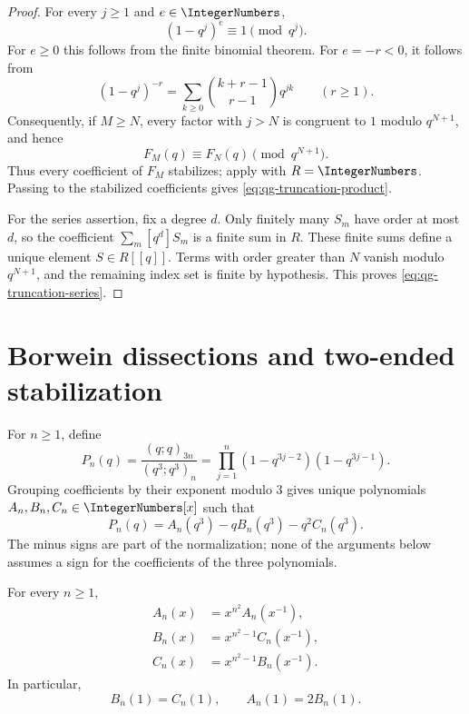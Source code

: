 \begin{proof}
For every \(j\ge1\) and \(e\in\IntegerNumbers\),
\[
 (1-q^j)^e\equiv1\pmod{q^j}.
\]
For \(e\ge0\) this follows from the finite binomial theorem.  For
\(e=-r<0\), it follows from
\[
 (1-q^j)^{-r}
 =\sum_{k\ge0}\binom{k+r-1}{r-1}q^{jk}
 \qquad(r\ge1).
\]
Consequently, if \(M\ge N\), every factor with \(j>N\) is congruent to \(1\)
modulo \(q^{N+1}\), and hence
\[
 F_M(q)\equiv F_N(q)\pmod{q^{N+1}}.
\]
Thus every coefficient of \(F_M\) stabilizes; apply
 with \(R=\IntegerNumbers\).  Passing to
the stabilized coefficients gives \eqref{eq:qg-truncation-product}.

For the series assertion, fix a degree \(d\).  Only finitely many \(S_m\)
have order at most \(d\), so the coefficient
\(\sum_m[q^d]S_m\) is a finite sum in \(R\).  These finite sums define a
unique element \(S\in R[[q]]\).  Terms with order greater than \(N\) vanish
modulo \(q^{N+1}\), and the remaining index set is finite by hypothesis.
This proves \eqref{eq:qg-truncation-series}.
\end{proof}

\section{Borwein dissections and two-ended stabilization}

For \(n\ge1\), define
\begin{equation}
 P_n(q)=\frac{(q;q)_{3n}}{(q^3;q^3)_n}
 =\prod_{j=1}^{n}(1-q^{3j-2})(1-q^{3j-1}).
\label{eq:qg-borwein-product}
\end{equation}
Grouping coefficients by their exponent modulo \(3\) gives unique
polynomials \(A_n,B_n,C_n\in\IntegerNumbers[x]\) such that
\begin{equation}
 P_n(q)=A_n(q^3)-qB_n(q^3)-q^2C_n(q^3).
\label{eq:qg-borwein-dissection}
\end{equation}
The minus signs are part of the normalization; none of the arguments below
assumes a sign for the coefficients of the three polynomials.

\begin{proposition}
\label{qg:prop-borwein-reciprocity}
For every \(n\ge1\),
\begin{align}
 A_n(x)&=x^{n^2}A_n(x^{-1}),\\
 B_n(x)&=x^{n^2-1}C_n(x^{-1}),\\
 C_n(x)&=x^{n^2-1}B_n(x^{-1}).
\label{eq:qg-borwein-reciprocity}
\end{align}
In particular,
\[
 B_n(1)=C_n(1),
 \qquad
 A_n(1)=2B_n(1).
\]
\end{proposition}

